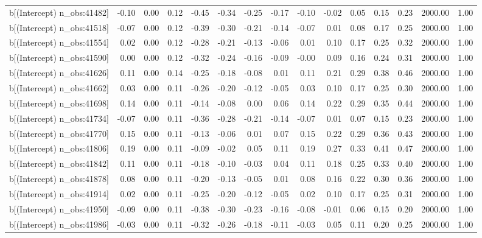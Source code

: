\begin{table}[ht]
\begin{tabular}{rrrrrrrrrrrrrrr}
  b[(Intercept) n\_obs:41482] & -0.10 & 0.00 & 0.12 & -0.45 & -0.34 & -0.25 & -0.17 & -0.10 & -0.02 & 0.05 & 0.15 & 0.23 & 2000.00 & 1.00 \\ 
  b[(Intercept) n\_obs:41518] & -0.07 & 0.00 & 0.12 & -0.39 & -0.30 & -0.21 & -0.14 & -0.07 & 0.01 & 0.08 & 0.17 & 0.25 & 2000.00 & 1.00 \\ 
  b[(Intercept) n\_obs:41554] & 0.02 & 0.00 & 0.12 & -0.28 & -0.21 & -0.13 & -0.06 & 0.01 & 0.10 & 0.17 & 0.25 & 0.32 & 2000.00 & 1.00 \\ 
  b[(Intercept) n\_obs:41590] & 0.00 & 0.00 & 0.12 & -0.32 & -0.24 & -0.16 & -0.09 & -0.00 & 0.09 & 0.16 & 0.24 & 0.31 & 2000.00 & 1.00 \\ 
  b[(Intercept) n\_obs:41626] & 0.11 & 0.00 & 0.14 & -0.25 & -0.18 & -0.08 & 0.01 & 0.11 & 0.21 & 0.29 & 0.38 & 0.46 & 2000.00 & 1.00 \\ 
  b[(Intercept) n\_obs:41662] & 0.03 & 0.00 & 0.11 & -0.26 & -0.20 & -0.12 & -0.05 & 0.03 & 0.10 & 0.17 & 0.25 & 0.30 & 2000.00 & 1.00 \\ 
  b[(Intercept) n\_obs:41698] & 0.14 & 0.00 & 0.11 & -0.14 & -0.08 & 0.00 & 0.06 & 0.14 & 0.22 & 0.29 & 0.35 & 0.44 & 2000.00 & 1.00 \\ 
  b[(Intercept) n\_obs:41734] & -0.07 & 0.00 & 0.11 & -0.36 & -0.28 & -0.21 & -0.14 & -0.07 & 0.01 & 0.07 & 0.15 & 0.23 & 2000.00 & 1.00 \\ 
  b[(Intercept) n\_obs:41770] & 0.15 & 0.00 & 0.11 & -0.13 & -0.06 & 0.01 & 0.07 & 0.15 & 0.22 & 0.29 & 0.36 & 0.43 & 2000.00 & 1.00 \\ 
  b[(Intercept) n\_obs:41806] & 0.19 & 0.00 & 0.11 & -0.09 & -0.02 & 0.05 & 0.11 & 0.19 & 0.27 & 0.33 & 0.41 & 0.47 & 2000.00 & 1.00 \\ 
  b[(Intercept) n\_obs:41842] & 0.11 & 0.00 & 0.11 & -0.18 & -0.10 & -0.03 & 0.04 & 0.11 & 0.18 & 0.25 & 0.33 & 0.40 & 2000.00 & 1.00 \\ 
  b[(Intercept) n\_obs:41878] & 0.08 & 0.00 & 0.11 & -0.20 & -0.13 & -0.05 & 0.01 & 0.08 & 0.16 & 0.22 & 0.30 & 0.36 & 2000.00 & 1.00 \\ 
  b[(Intercept) n\_obs:41914] & 0.02 & 0.00 & 0.11 & -0.25 & -0.20 & -0.12 & -0.05 & 0.02 & 0.10 & 0.17 & 0.25 & 0.31 & 2000.00 & 1.00 \\ 
  b[(Intercept) n\_obs:41950] & -0.09 & 0.00 & 0.11 & -0.38 & -0.30 & -0.23 & -0.16 & -0.08 & -0.01 & 0.06 & 0.15 & 0.20 & 2000.00 & 1.00 \\ 
  b[(Intercept) n\_obs:41986] & -0.03 & 0.00 & 0.11 & -0.32 & -0.26 & -0.18 & -0.11 & -0.03 & 0.05 & 0.11 & 0.20 & 0.25 & 2000.00 & 1.00 \\ 

\end{tabular}
\end{table}
